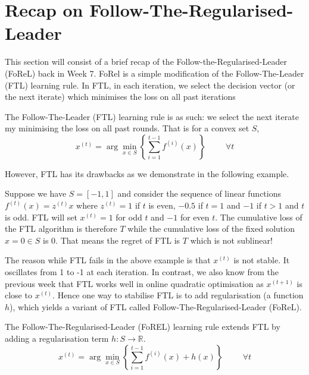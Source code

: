 \section{Recap on Follow-The-Regularised-Leader}
This section will consist of a brief recap of the Follow-the-Regularised-Leader (FoReL) back in Week 7. FoRel \citep{shalev2007online, shalev2007primal} is a simple modification of the Follow-The-Leader (FTL) \citep{kalai2005efficient} learning rule.  In FTL, in each iteration, we select the decision vector (or the next iterate) which minimises the loss on all past iterations
\begin{define}
    The Follow-The-Leader (FTL) learning rule is as such: we select the next iterate my minimising the loss on all past rounds. That is for a convex set $S$,
    \begin{equation}
        x^{(t)} = \arg \min_{x \in S} \left\{\sum_{i = 1}^{t-1} f^{(i)}(x)\right\}\hspace{1cm}\forall t
    \end{equation}
\end{define}
However, FTL has its drawbacks as we demonstrate in the following example.
\begin{example}
    Suppose we have $S = [-1, 1]$ and consider the sequence of linear functions $f^{(t)}(x) = z^{(t)}x$ where $z^{(t)} = 1$ if $t$ is even, $-0.5$ if $t = 1$ and $-1$ if $t > 1$ and $t$ is odd. FTL will set $x^{(t)} = 1$ for odd $t$ and $-1$ for even $t$. The cumulative loss of the FTL algorithm is therefore $T$ while the cumulative loss of the fixed solution $x = 0 \in S$ is 0. That means the regret of FTL is $T$ which is not sublinear!
\end{example}
The reason while FTL fails in the above example is that $x^{(t)}$ is not stable. It oscillates from 1 to -1 at each iteration. In contrast, we also know from the previous week that FTL works well in online quadratic optimisation as $x^{(t+1)}$ is close to $x^{(t)}$. Hence one way to stabilise FTL is to add regularisation (a function $h$), which yields a variant of FTL called Follow-The-Regularised-Leader (FoReL).

\begin{define}\label{defn:forel} The Follow-The-Regularised-Leader (FoREL) learning rule extends FTL by adding a regularisation term $h: S \to \mathbb R$.
    \begin{equation}
        x^{(t)} = \arg \min_{x \in S} \left\{\sum_{i = 1}^{t-1} f^{(i)}(x) + h(x)\right\}\hspace{1cm}\forall t
    \end{equation}
\end{define}

